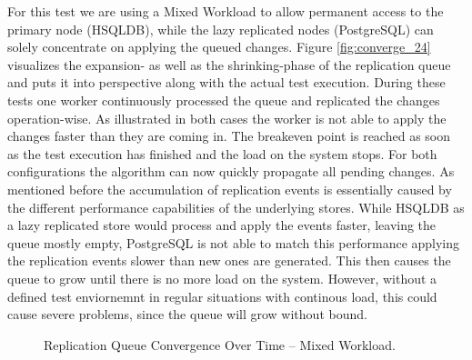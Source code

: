 
For this test we are using a Mixed Workload to allow permanent access to the primary node (HSQLDB), while the lazy replicated nodes (PostgreSQL) can solely concentrate on applying the queued changes.
Figure \ref{fig:converge_24} visualizes the expansion- as well as the shrinking-phase of the replication queue
and puts it into perspective along with the actual test execution. During these tests one worker continuously processed the queue and replicated 
the changes operation-wise. As illustrated in both cases the worker is not able to apply the changes faster than they are coming in.
The breakeven point is reached as soon as the test execution has finished and the load on the system stops. For both configurations the algorithm can now quickly propagate all pending
changes.
As mentioned before the accumulation of replication events is essentially caused by the different performance capabilities of the underlying stores. 
While HSQLDB as a lazy replicated store would process and apply the events faster, 
leaving the queue mostly empty, PostgreSQL is not able to match this performance applying the replication events slower than new ones
are generated. This then causes the queue to grow until there is no more load on the system.
However, without a defined test enviornemnt in regular situations with continous load, this could cause severe problems,
since the queue will grow without bound.

\begin{figure}[t] 
    \centering 
    \caption{Replication Queue Convergence Over Time -- Mixed Workload.}
    \label{fig:converge24}
\end{figure}


